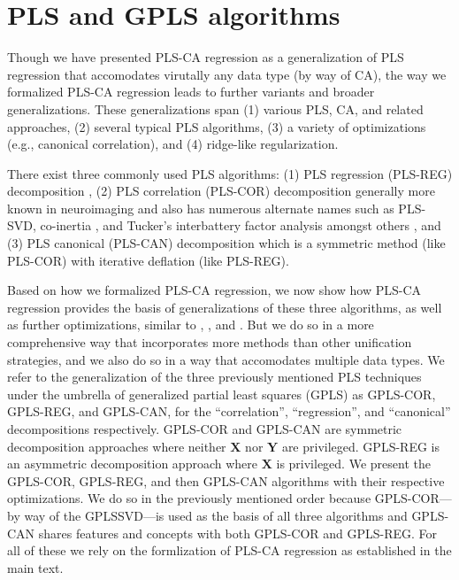 \documentclass[12pt]{article}
\begin{document}
\hypertarget{pls-and-gpls-algorithms}{%
\section{PLS and GPLS algorithms}\label{pls-and-gpls-algorithms}}

Though we have presented PLS-CA regression as a generalization of PLS
regression that accomodates virutally any data type (by way of CA), the
way we formalized PLS-CA regression leads to further variants and
broader generalizations. These generalizations span (1) various PLS, CA,
and related approaches, (2) several typical PLS algorithms, (3) a
variety of optimizations (e.g., canonical correlation), and (4)
ridge-like regularization.

There exist three commonly used PLS algorithms: (1) PLS regression
(PLS-REG) decomposition
\citep{wold1975soft, wold_collinearity_1984, wold_pls-regression_2001, abdi_partial_2010-1},
(2) PLS correlation (PLS-COR) decomposition
\citep{bookstein1994partial, ketterlinus1989partial} generally more
known in neuroimaging
\citep{mcintosh_spatial_1996, mcintosh_partial_2004, krishnan_partial_2011}
and also has numerous alternate names such as PLS-SVD, co-inertia
\citep[\citet{dray2014}]{doledec1994}, and Tucker's interbattery factor
analysis \citep{tucker_inter-battery_1958} amongst others \citep[see
also][]{beaton_partial_2016}, and (3) PLS canonical (PLS-CAN)
decomposition \citep{tenenhaus_regression_1998, wegelin2000survey} which
is a symmetric method (like PLS-COR) with iterative deflation (like
PLS-REG).

Based on how we formalized PLS-CA regression, we now show how PLS-CA
regression provides the basis of generalizations of these three
algorithms, as well as further optimizations, similar to
\citet{borga_unified_1992}, \citet{indahl2009canonical}, and
\citet{de2019pls}. But we do so in a more comprehensive way that
incorporates more methods than other unification strategies, and we also
do so in a way that accomodates multiple data types. We refer to the
generalization of the three previously mentioned PLS techniques under
the umbrella of generalized partial least squares (GPLS) as GPLS-COR,
GPLS-REG, and GPLS-CAN, for the ``correlation'', ``regression'', and
``canonical'' decompositions respectively. GPLS-COR and GPLS-CAN are
symmetric decomposition approaches where neither \({\mathbf X}\) nor
\({\mathbf Y}\) are privileged. GPLS-REG is an asymmetric decomposition
approach where \({\mathbf X}\) is privileged. We present the GPLS-COR,
GPLS-REG, and then GPLS-CAN algorithms with their respective
optimizations. We do so in the previously mentioned order because
GPLS-COR---by way of the GPLSSVD---is used as the basis of all three
algorithms and GPLS-CAN shares features and concepts with both GPLS-COR
and GPLS-REG. For all of these we rely on the formlization of PLS-CA
regression as established in the main text.
\end{document}
